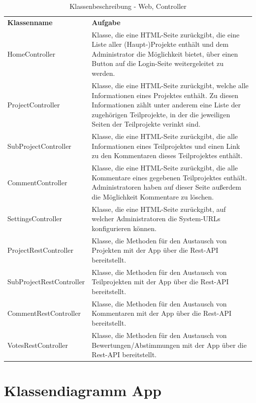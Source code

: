\begin{table}[H]
	\centering
	\begin{tabularx}{\textwidth}{X X}
		\rowcolor[HTML]{C0C0C0} 
		\textbf{Klassenname} & \textbf{Aufgabe} \\
		HomeController & Klasse, die eine HTML-Seite zurückgibt, die eine Liste aller (Haupt-)Projekte enthält und dem Administrator die Möglichkeit bietet, über einen Button auf die Login-Seite weitergeleitet zu werden. \\
		\rowcolor[HTML]{E7E7E7}
		ProjectController & Klasse, die eine HTML-Seite zurückgibt, welche alle Informationen eines Projektes enthält. Zu diesen Informationen zählt unter anderem eine Liste der zugehörigen Teilprojekte, in der die jeweiligen Seiten der Teilprojekte verinkt sind.  \\
		 SubProjectController &  Klasse, die eine HTML-Seite zurückgibt, die alle Informationen eines Teilprojektes und einen Link zu den Kommentaren dieses Teilprojektes enthält. \\
		 \rowcolor[HTML]{E7E7E7}
		CommentController & Klasse, die eine HTML-Seite zurückgibt, die alle Kommentare eines gegebenen Teilprojektes enthält. Administratoren haben auf dieser Seite außerdem die Möglichkeit Kommentare zu löschen. \\
		SettingsController & Klasse, die eine HTML-Seite zurückgibt, auf welcher Administratoren die System-URLs konfigurieren können.  \\
		\rowcolor[HTML]{E7E7E7}
		ProjectRestController & Klasse, die Methoden für den Austausch von Projekten mit der App über die Rest-API bereitstellt.  \\
		 SubProjectRestController &  Klasse, die Methoden für den Austausch von Teilprojekten mit der App über die Rest-API bereitstellt. \\
		 \rowcolor[HTML]{E7E7E7}
		CommentRestController & Klasse, die Methoden für den Austausch von Kommentaren mit der App über die Rest-API bereitstellt. \\
		VotesRestController & Klasse, die Methoden für den Austausch von Bewertungen/Abstimmungen mit der App über die Rest-API bereitstellt.  \\
	\end{tabularx}
	\caption{Klassenbeschreibung - Web, Controller}
	\label{table:klassenbeschreibung-web-controller}
\end{table}

\section{Klassendiagramm App}


